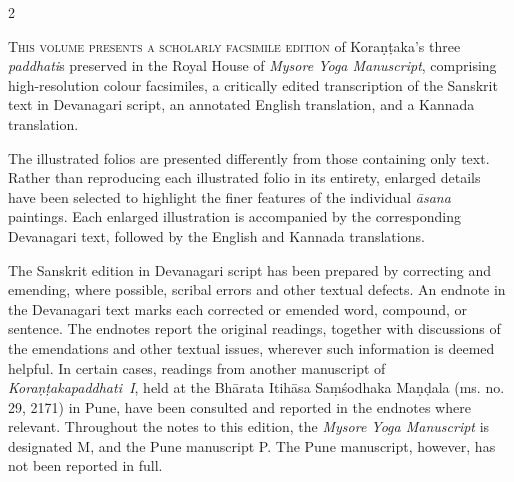 \begin{nohyp}
\begin{multicols*}{2}
\begin{eng}
\lettrine[lines=3,lhang=0.04,nindent=0em]{T}{his volume presents a scholarly facsimile edition} of Koraṇṭaka's three \emph{paddhati}s preserved in the Royal House of \emph{Mysore Yoga Manuscript}, comprising high-resolution colour facsimiles, a critically edited transcription of the Sanskrit text in Devanagari script, an annotated English translation, and a Kannada translation.

The illustrated folios are presented differently from those containing only text. Rather than reproducing each illustrated folio in its entirety, enlarged details have been selected to highlight the finer features of the individual \emph{āsana} paintings. Each enlarged illustration is accompanied by the corresponding Devanagari text, followed by the English and Kannada translations. 

The Sanskrit edition in Devanagari script has been prepared by correcting and emending, where possible, scribal errors and other textual defects. An endnote in the Devanagari text marks each corrected or emended word, compound, or sentence. The endnotes report the original readings, together with discussions of the emendations and other textual issues, wherever such information is deemed helpful. In certain cases, readings from another manuscript of \emph{Koraṇṭakapaddhati~I}, held at the Bhārata Itihāsa Saṃśodhaka Maṇḍala (ms. no. 29, 2171) in Pune, have been consulted and reported in the endnotes where relevant. Throughout the notes to this edition, the \emph{Mysore Yoga Manuscript} is designated M, and the Pune manuscript P. The Pune manuscript, however, has not been reported in full.


\end{eng}
\end{multicols*}
\end{nohyp}
